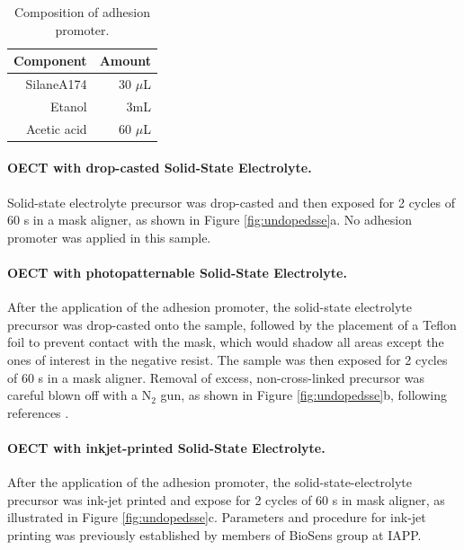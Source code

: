 \begin{table}[ht]
	\centering
	\caption{Composition of adhesion promoter.}
	\begin{tabular}{r r} \hline
		Component   & Amount \\ \hline
		SilaneA174	& 30 $\mu$L \\ 
		Etanol   & 3mL \\ 
		Acetic acid   & 60 $\mu$L \\ \hline
	\end{tabular}
	\label{tab:adprom}
\end{table}

\paragraph{OECT with drop-casted Solid-State Electrolyte.}Solid-state electrolyte precursor was drop-casted and then exposed for 2 cycles of 60 s in a mask aligner, as shown in Figure \ref{fig:undopedsse}a. No adhesion promoter was applied in this sample.

\paragraph{OECT with photopatternable Solid-State Electrolyte.}After the application of the adhesion promoter, the solid-state electrolyte precursor was drop-casted onto the sample, followed by the placement of a Teflon foil to prevent contact with the mask, which would shadow all areas except the ones of interest in the negative resist. The sample was then exposed for 2 cycles of 60 s in a mask aligner. Removal of excess, non-cross-linked precursor was careful blown off with a N$_{2}$ gun, as shown in Figure \ref{fig:undopedsse}b,  following references \cite{weissbachPhotopatternableSolidElectrolyte2022}\cite{bongartzOrganicElectrochemicalTransistors2021}.

\paragraph{OECT with inkjet-printed Solid-State Electrolyte.}After the application of the adhesion promoter, the solid-state-electrolyte precursor was ink-jet printed and expose for 2 cycles of 60 s in mask aligner, as illustrated in Figure \ref{fig:undopedsse}c. Parameters and procedure for ink-jet printing was previously established by members of BioSens group at IAPP. 

